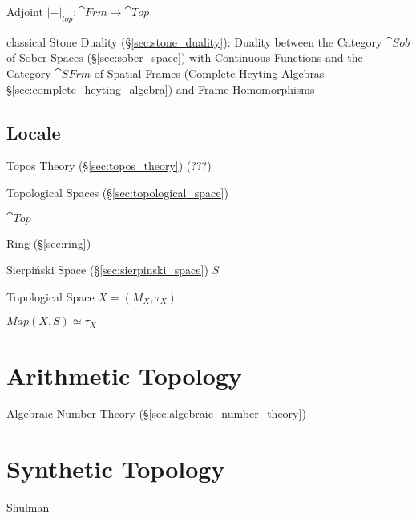 Adjoint $|-|_{top} : \cat{Frm} \rightarrow \cat{Top}$ %

classical Stone Duality (\S\ref{sec:stone_duality}): Duality between the
Category $\cat{Sob}$ of Sober Spaces (\S\ref{sec:sober_space}) with Continuous
Functions and the Category $\cat{SFrm}$ of Spatial Frames (Complete Heyting
Algebras \S\ref{sec:complete_heyting_algebra}) and Frame Homomorphisms



\subsection{Locale}\label{sec:locale}

Topos Theory (\S\ref{sec:topos_theory}) (???)

Topological Spaces (\S\ref{sec:topological_space})

$\cat{Top}$

Ring (\S\ref{sec:ring})

Sierpi\'nski Space (\S\ref{sec:sierpinski_space}) $S$

Topological Space $X = (M_X,\tau_X)$

$Map(X,S) \simeq \tau_X$



\section{Arithmetic Topology}\label{sec:arithmetic_topology}

Algebraic Number Theory (\S\ref{sec:algebraic_number_theory})



\section{Synthetic Topology}\label{sec:synthetic_topology}

\fist Shulman
